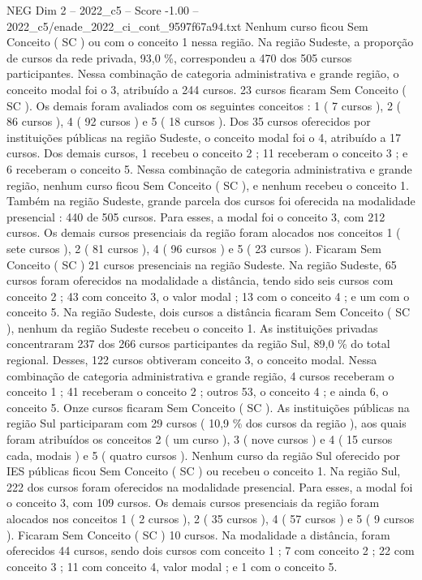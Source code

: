 \begin{textsample}{NEG Dim 2 – 2022\_c5 – Score -1.00 – 2022\_c5/enade\_2022\_ci\_cont\_9597f67a94.txt}
Nenhum curso ficou Sem Conceito ( SC ) ou com o conceito 1 nessa região.
Na região Sudeste, a proporção de cursos da rede privada, 93,0 \%, correspondeu a 470 dos 505 cursos participantes.
Nessa combinação de categoria administrativa e grande região, o conceito modal foi o 3, atribuído a 244 cursos. 23 cursos ficaram Sem Conceito ( SC ).
Os demais foram avaliados com os seguintes conceitos : 1 ( 7 cursos ), 2 ( 86 cursos ), 4 ( 92 cursos ) e 5 ( 18 cursos ).
Dos 35 cursos oferecidos por instituições públicas na região Sudeste, o conceito modal foi o 4, atribuído a 17 cursos.
Dos demais cursos, 1 recebeu o conceito 2 ; 11 receberam o conceito 3 ; e 6 receberam o conceito 5.
Nessa combinação de categoria administrativa e grande região, nenhum curso ficou Sem Conceito ( SC ), e nenhum recebeu o conceito 1.
Também na região Sudeste, grande parcela dos cursos foi oferecida na modalidade presencial : 440 de 505 cursos.
Para esses, a modal foi o conceito 3, com 212 cursos.
Os demais cursos presenciais da região foram alocados nos conceitos 1 ( sete cursos ), 2 ( 81 cursos ), 4 ( 96 cursos ) e 5 ( 23 cursos ).
Ficaram Sem Conceito ( SC ) 21 cursos presenciais na região Sudeste.
Na região Sudeste, 65 cursos foram oferecidos na modalidade a distância, tendo sido seis cursos com conceito 2 ; 43 com conceito 3, o valor modal ; 13 com o conceito 4 ; e um com o conceito 5.
Na região Sudeste, dois cursos a distância ficaram Sem Conceito ( SC ), nenhum da região Sudeste recebeu o conceito 1.
As instituições privadas concentraram 237 dos 266 cursos participantes da região Sul, 89,0 \% do total regional.
Desses, 122 cursos obtiveram conceito 3, o conceito modal.
Nessa combinação de categoria administrativa e grande região, 4 cursos receberam o conceito 1 ; 41 receberam o conceito 2 ; outros 53, o conceito 4 ; e ainda 6, o conceito 5.
Onze cursos ficaram Sem Conceito ( SC ).
As instituições públicas na região Sul participaram com 29 cursos ( 10,9 \% dos cursos da região ), aos quais foram atribuídos os conceitos 2 ( um curso ), 3 ( nove cursos ) e 4 ( 15 cursos cada, modais ) e 5 ( quatro cursos ).
Nenhum curso da região Sul oferecido por IES públicas ficou Sem Conceito ( SC ) ou recebeu o conceito 1.
Na região Sul, 222 dos cursos foram oferecidos na modalidade presencial.
Para esses, a modal foi o conceito 3, com 109 cursos.
Os demais cursos presenciais da região foram alocados nos conceitos 1 ( 2 cursos ), 2 ( 35 cursos ), 4 ( 57 cursos ) e 5 ( 9 cursos ).
Ficaram Sem Conceito ( SC ) 10 cursos.
Na modalidade a distância, foram oferecidos 44 cursos, sendo dois cursos com conceito 1 ; 7 com conceito 2 ; 22 com conceito 3 ; 11 com conceito 4, valor modal ; e 1 com o conceito 5.

\end{textsample}
